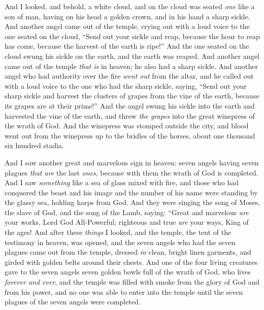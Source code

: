 \begin{biblechapter}
 And I looked, and behold, a white cloud, and on the cloud was seated \textit{one} like a son of man, having on his head a golden crown, and in his hand a sharp sickle.
\verse And another angel came out of the temple, crying out with a loud voice to the one seated on the cloud, “Send out your sickle and reap, because the hour to reap has come, because the harvest of the earth is ripe!”
\verse And the one seated on the cloud swung his sickle on the earth, and the earth was reaped.
\verse And another angel came out of the temple \textit{that is} in heaven; he also had a sharp sickle.
\verse And another angel who had authority over the fire \textit{went out} from the altar, and he called out with a loud voice to the one who had the sharp sickle, saying, “Send out your sharp sickle and harvest the clusters of grapes from the vine of the earth, because its grapes are at their prime!”
\verse And the angel swung his sickle into the earth and harvested the vine of the earth, and threw \textit{the grapes} into the great winepress of the wrath of God.
\verse And the winepress was stomped outside the city, and blood went out from the winepress up to the bridles of the horses, about one thousand six hundred stadia.
\end{biblechapter}

\begin{biblechapter} %
 And I saw another great and marvelous sign in heaven: seven angels having seven plagues \textit{that are} the last \textit{ones}, because with them the wrath of God is completed.
\verse And I saw \textit{something} like a sea of glass mixed with fire, and those who had conquered the beast and his image and the number of his name were standing by the glassy sea, holding harps from God.
\verse And they were singing the song of Moses, the slave of God, and the song of the Lamb, saying:
\verse “Great and marvelous \textit{are} your works, 
Lord God All-Powerful; 
righteous and true \textit{are} your ways, 
King of the ages!
\verse And after these \textit{things} I looked, and the temple, the tent of the testimony in heaven, was opened,
\verse and the seven angels who had the seven plagues came out from the temple, dressed \textit{in} clean, bright linen garments, and girded with golden belts around their chests.
\verse And one of the four living creatures gave to the seven angels seven golden bowls full of the wrath of God, who lives \textit{forever and ever},
\verse and the temple was filled with smoke from the glory of God and from his power, and no one was able to enter into the temple until the seven plagues of the seven angels were completed.
\end{biblechapter}

